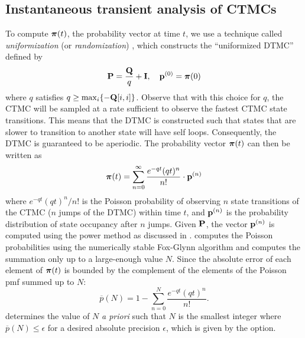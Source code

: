 \subsection{Instantaneous transient analysis of CTMCs}\label{SEC:inst-trans-anal-CTMC}
To compute $\gvect{\pi}(t)$, the probability vector at time $t$, we use a
technique called \emph{uniformization}
(or \emph{randomization})
\cite{Grassmann1991}, which constructs the ``uniformized DTMC'' defined by
\[
   \P = \frac{\Q}{q} + \I, \quad \vp^{(0)} = \vpi(0)
\]
where $q$ satisfies $q \ge \max_i\{-\Q[i,i]\}$.  Observe that with this
choice for $q$, the CTMC will be sampled at a rate sufficient to observe the
fastest CTMC state transitions.  This means that the DTMC is constructed such that
states that are slower to transition to another state will have self loops.
Consequently, the DTMC is guaranteed to be aperiodic.
The probability vector $\gvect{\pi}(t)$ can then be written as
\[
  \gvect{\pi}(t) = \sum_{n=0}^{\infty} \frac{e^{-qt}(qt)^n}{n!}
     \cdot \vp^{(n)}
\]
where ${e^{-qt}(qt)^n}/{n!}$ is the Poisson probability of
observing $n$ state transitions of the CTMC ($n$ jumps of the DTMC) within time $t$,
and $\vp^{(n)}$ is the probability distribution of state occupancy after $n$ jumps.
Given $\P$, the vector $\vp^{(n)}$ is computed using the power method as discussed
in . {\smart} computes the Poisson probabilities using the
numerically stable Fox-Glynn algorithm \cite{Fox1988} and computes the summation
only up to a large-enough value $N$.
Since the absolute error of each element of $\gvect{\pi}(t)$
is bounded by the complement of the elements of the Poisson pmf summed up to $N$:
\[
  \overline{p}(N) = 1 - \sum_{n=0}^{N} \frac{e^{-qt}(qt)^n}{n!}.
\]
{\smart} determines the value of $N$ \emph{a priori} such that $N$ is the
smallest integer where $\overline{p}(N) \le \epsilon$
for a desired absolute precision $\epsilon$, which is given by the
 option.

